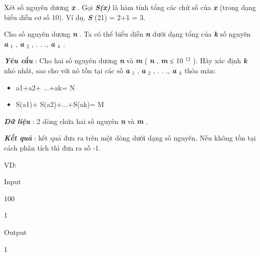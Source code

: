 



   Xét số nguyên dương   \textbf{\emph{     x    }}   . Gọi   \textbf{\emph{     S(x)    }}   là hàm tính tổng các chữ số của   \textbf{\emph{     x    }}   (trong dạng biểu diễn cơ số 10). Ví dụ,   \textbf{\emph{     S    }}   (21) = 2+1 = 3.  

   Cho số nguyên dương   \textbf{\emph{     n    }}   . Ta có thể biểu diễn   \textbf{\emph{     n    }}   dưới dạng tổng của   \textbf{\emph{     k    }}   số nguyên   \textbf{\emph{     a    }}$_    1   $   ,   \textbf{\emph{     a    }}$_    2   $   , . . .,   \textbf{\emph{     a     $_      k     $}}   .  

\textbf{\emph{     Yêu cầu    }}   : Cho hai số nguyên dương   \textbf{\emph{     n    }}   và   \textbf{\emph{     m    }}   (   \textbf{\emph{     n    }}   ,   \textbf{\emph{     m    }}   ≤ 10   $^    12   $   ). Hãy xác định   \textbf{\emph{     k    }}   nhỏ nhất, sao cho với nó tồn tại các số   \textbf{\emph{     a    }}$_    1   $   ,   \textbf{\emph{     a    }}$_    2   $   , . . .,   \textbf{\emph{     a     $_      k     $}}   thỏa mãn:  
\begin{itemize}
	\item     a1+a2+ ...+ak= N   
	\item     S(a1)+ S(a2)+...+S(ak)= M   
\end{itemize}

\textbf{\emph{     Dữ liệu    }}   : 2 dòng chứa hai số nguyên   \textbf{\emph{     n    }}   và   \textbf{\emph{     m    }}   .  

\textbf{\emph{     Kết quả    }}   : kết quả đưa ra trên một dòng dưới dạng số nguyên. Nếu không tồn tại cách phân tích thì đưa ra số -1.  

   VD:  

   Input  

   100  

   1  

   Output  

   1  